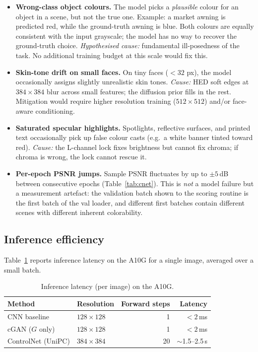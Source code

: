 \documentclass[conference]{IEEEtran}
\begin{document}
\begin{itemize}
  \item \textbf{Wrong-class object colours.} The model picks a
        \emph{plausible} colour for an object in a scene, but not the
        true one. Example: a market awning is predicted red, while the
        ground-truth awning is blue. Both colours are equally
        consistent with the input grayscale; the model has no way to
        recover the ground-truth choice.
        \emph{Hypothesised cause:} fundamental ill-posedness of the
        task. No additional training budget at this scale would fix
        this.
  \item \textbf{Skin-tone drift on small faces.} On tiny faces ($<32$
        px), the model occasionally assigns slightly unrealistic skin
        tones. \emph{Cause:} HED soft edges at $384\times384$ blur
        across small features; the diffusion prior fills in the rest.
        Mitigation would require higher resolution training
        ($512\times512$) and/or face-aware conditioning.
  \item \textbf{Saturated specular highlights.} Spotlights, reflective
        surfaces, and printed text occasionally pick up false colour
        casts (e.g.\ a white banner tinted toward red). \emph{Cause:}
        the L-channel lock fixes brightness but cannot fix chroma; if
        chroma is wrong, the lock cannot rescue it.
  \item \textbf{Per-epoch PSNR jumps.} Sample PSNR fluctuates by up
        to $\pm 5$\,dB between consecutive epochs
        (Table~\ref{tab:cnet}). This is \emph{not} a model failure but
        a measurement artefact: the validation batch shown to the
        scoring routine is the first batch of the val loader, and
        different first batches contain different scenes with
        different inherent colorability.
\end{itemize}

\subsection{Inference efficiency}
Table~\ref{tab:speed} reports inference latency on the A10G for a
single image, averaged over a small batch.

\begin{table}[!t]
\centering
\caption{Inference latency (per image) on the A10G.}
\label{tab:speed}
\setlength\tabcolsep{6pt}
\begin{tabular}{llrr}
\toprule
\textbf{Method} & \textbf{Resolution} & \textbf{Forward steps} & \textbf{Latency} \\
\midrule
CNN baseline      & $128\!\times\!128$ & 1   & $<2$\,ms   \\
cGAN ($G$ only)   & $128\!\times\!128$ & 1   & $<2$\,ms   \\
ControlNet (UniPC)& $384\!\times\!384$ & 20  & $\sim$1.5--2.5\,s \\
\bottomrule
\end{tabular}
\end{table}
\end{document}
